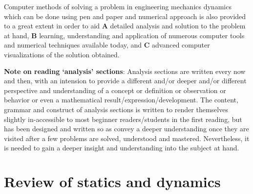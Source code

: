 \documentclass[]{book}
\begin{document}
Computer methods of solving a problem in engineering mechanics dynamics which can be done using pen and paper and numerical approach is also provided to a great extent in order to aid \textbf{A} detailed analysis and solution to the problem at hand, \textbf{B} learning, understanding and application of numerous computer tools and numerical techniques available today, and \textbf{C} advanced computer visualizations of the solution obtained.

\textbf{Note on reading `analysis' sections}: Analysis sections are written every now and then, with an intension to provide a different and/or deeper and/or different perspective and understanding of a concept or definition or observation or behavior or even a mathematical result/expression/development. The content, grammar and construct of analysis sections is written to render themselves slightly in-accessible to most beginner readers/students in the first reading, but has been designed and written so as convey a deeper understanding once they are visited after a few problems are  solved, understood and mastered. Nevertheless, it is needed to gain a deeper insight and understanding into the subject at hand.
\part{Review of statics and dynamics} %
\end{document}

